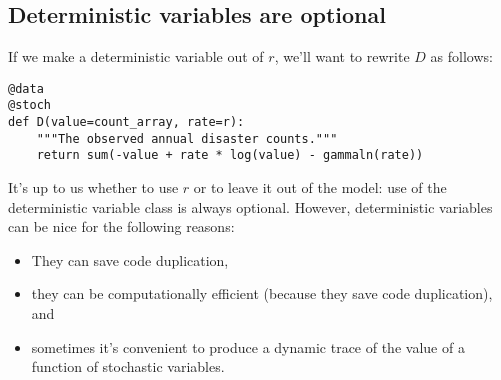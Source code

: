 \subsection{Deterministic variables are optional}
If we make a deterministic variable out of $r$, we'll want to rewrite $D$ as follows:
\begin{verbatim}
@data
@stoch
def D(value=count_array, rate=r):
    """The observed annual disaster counts."""
    return sum(-value + rate * log(value) - gammaln(rate))
\end{verbatim}
It's up to us whether to use $r$ or to leave it out of the model: use of the deterministic variable class is always optional. However, deterministic variables can be nice for the following reasons:
\begin{itemize}
    \item They can save code duplication,    
    \item they can be computationally efficient (because they save code duplication), and
    \item sometimes it's convenient to produce a dynamic trace of the value of a function of stochastic variables.
\end{itemize}


